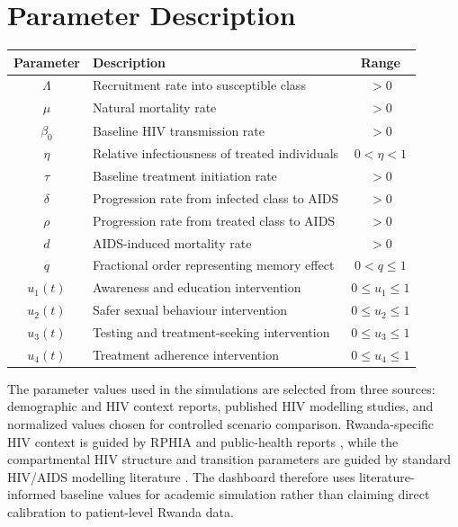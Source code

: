 \documentclass[12pt,a4paper,oneside]{report}
\begin{document}
\section{Parameter Description}
\begin{center}
\renewcommand{\arraystretch}{1.35}
\begin{tabular}{>{\bfseries}c p{7.5cm}c}
\toprule
Parameter & Description & Range\\
\midrule
$\Lambda$ & Recruitment rate into susceptible class & $>0$\\
$\mu$ & Natural mortality rate & $>0$\\
$\beta_0$ & Baseline HIV transmission rate & $>0$\\
$\eta$ & Relative infectiousness of treated individuals & $0<\eta<1$\\
$\tau$ & Baseline treatment initiation rate & $>0$\\
$\delta$ & Progression rate from infected class to AIDS & $>0$\\
$\rho$ & Progression rate from treated class to AIDS & $>0$\\
$d$ & AIDS-induced mortality rate & $>0$\\
$q$ & Fractional order representing memory effect & $0<q\leq1$\\
$u_1(t)$ & Awareness and education intervention & $0\leq u_1\leq1$\\
$u_2(t)$ & Safer sexual behaviour intervention & $0\leq u_2\leq1$\\
$u_3(t)$ & Testing and treatment-seeking intervention & $0\leq u_3\leq1$\\
$u_4(t)$ & Treatment adherence intervention & $0\leq u_4\leq1$\\
\bottomrule
\end{tabular}
\end{center}

The parameter values used in the simulations are selected from three sources: demographic and HIV context reports, published HIV modelling studies, and normalized values chosen for controlled scenario comparison. Rwanda-specific HIV context is guided by RPHIA and public-health reports \citep{RBC2020RPHIA,RRP2020Stigma}, while the compartmental HIV structure and transition parameters are guided by standard HIV/AIDS modelling literature \citep{AndersonMay1991,SilvaTorres2017,Gunerhan2020,Unaegbu2021}. The dashboard therefore uses literature-informed baseline values for academic simulation rather than claiming direct calibration to patient-level Rwanda data.
\end{document}
